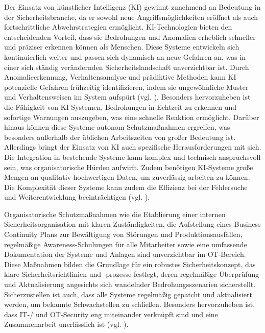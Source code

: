 Der Einsatz von künstlicher Intelligenz (KI) gewinnt zunehmend an Bedeutung in der Sicherheitsbranche, da er sowohl neue Angriffsmöglichkeiten eröffnet als auch fortschrittliche Abwehrstrategien ermöglicht. KI-Technologien bieten den entscheidenden Vorteil, dass sie Bedrohungen und Anomalien erheblich schneller und präziser erkennen können als Menschen. Diese Systeme entwickeln sich kontinuierlich weiter und passen sich dynamisch an neue Gefahren an, was in einer sich ständig verändernden Sicherheitslandschaft unverzichtbar ist. Durch Anomalieerkennung, Verhaltensanalyse und prädiktive Methoden kann KI potenzielle Gefahren frühzeitig identifizieren, indem sie ungewöhnliche Muster und Verhaltensweisen im System aufspürt (vgl. \cite{hornetsec}). Besonders hervorzuheben ist die Fähigkeit von KI-Systemen, Bedrohungen in Echtzeit zu erkennen und sofortige Warnungen auszugeben, was eine schnelle Reaktion ermöglicht. Darüber hinaus können diese Systeme autonom Schutzmaßnahmen ergreifen, was besonders außerhalb der üblichen Arbeitszeiten von großer Bedeutung ist. Allerdings bringt der Einsatz von KI auch spezifische Herausforderungen mit sich. Die Integration in bestehende Systeme kann komplex und technisch anspruchsvoll sein, was organisatorische Hürden aufwirft. Zudem benötigen KI-Systeme große Mengen an qualitativ hochwertigen Daten, um zuverlässig arbeiten zu können. Die Komplexität dieser Systeme kann zudem die Effizienz bei der Fehlersuche und Weiterentwicklung beeinträchtigen (vgl. \cite{itPort}). 

Organisatorische Schutzmaßnahmen wie die Etablierung einer internen Sicherheitsorganisation mit klaren Zuständigkeiten, die Aufstellung eines Business Continuity Plans zur Bewältigung von Störungen und Produktionsausfällen, regelmäßige Awareness-Schulungen für alle Mitarbeiter sowie eine umfassende Dokumentation der Systeme und Anlagen sind unverzichtbar im OT-Bereich. Diese Maßnahmen bilden die Grundlage für ein robustes Sicherheitskonzept, das klare Sicherheitsrichtlinien und -prozesse festlegt, deren regelmäßige Überprüfung und Aktualisierung angesichts sich wandelnder Bedrohungsszenarien sicherstellt. Sicherzustellen ist auch, dass alle Systeme regelmäßig gepatcht und aktualisiert werden, um bekannte Schwachstellen zu schließen. Besonders hervorzuheben ist, dass IT-/ und OT-Security eng miteinander verknüpft sind und eine Zusammenarbeit unerlässlich ist (vgl. \cite{orga}).



